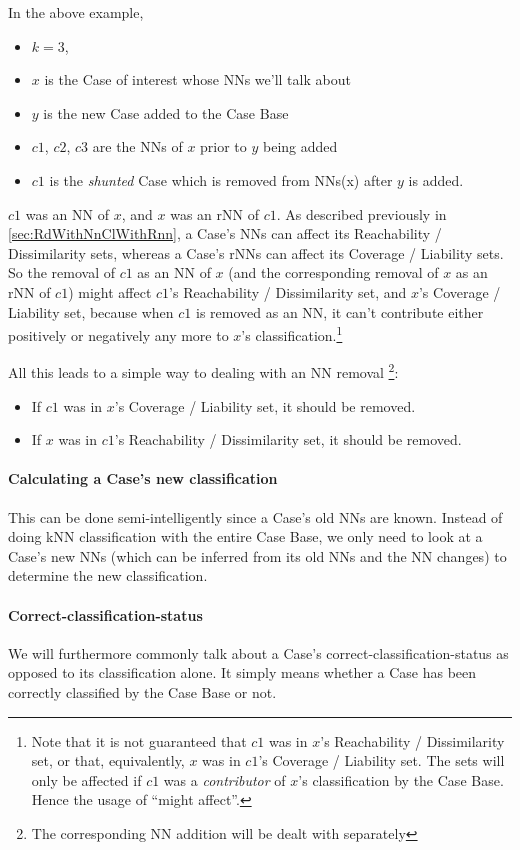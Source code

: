\documentclass[a4paper,11pt]{report}
\begin{document}
In the above example,
\begin{itemize}
	\item $k=3$, 
	\item $x$ is the Case of interest whose NNs  we'll talk about
	\item $y$ is the new Case added to the Case Base
	\item $c1$, $c2$, $c3$ are the NNs of $x$ prior to $y$ being added
	\item $c1$ is the \emph{shunted} Case which is removed from NNs(x) after $y$ is added.
\end{itemize}

$c1$ was an NN of $x$, and $x$ was an rNN of $c1$. As described previously in \ref{sec:RdWithNnClWithRnn}, a Case's NNs can affect its Reachability / Dissimilarity sets, whereas a Case's rNNs can affect its Coverage / Liability sets. So the removal of $c1$ as an NN of $x$ (and the corresponding removal of $x$ as an rNN of $c1$) might affect $c1$'s Reachability / Dissimilarity set, and $x$'s Coverage / Liability set, because when $c1$ is removed as an NN, it can't contribute either positively or negatively any more to $x$'s classification.\footnote{Note that it is not guaranteed that $c1$ was in $x$'s Reachability / Dissimilarity set, or that, equivalently, $x$ was in $c1$'s Coverage / Liability set. The sets will only be affected if $c1$ was a \emph{contributor} of $x$'s classification by the Case Base. Hence the usage of ``might affect''.}

All this leads to a simple way to dealing with an NN removal \footnote{The corresponding NN addition will be dealt with separately}:
\begin{itemize}
	\item If $c1$ was in $x$'s Coverage / Liability set, it should be removed.
	\item If $x$ was in $c1$'s Reachability / Dissimilarity set, it should be removed.
\end{itemize}

\paragraph{Calculating a Case's new classification}
This can be done semi-intelligently since a Case's old NNs are known. Instead of doing kNN classification with the entire Case Base, we only need to look at a Case's new NNs (which can be inferred from its old NNs and the NN changes) to determine the new classification.

\paragraph{Correct-classification-status}
We will furthermore commonly talk about a Case's correct-classification-status as opposed to its classification alone. It simply means whether a Case has been correctly classified by the Case Base or not. 
\end{document}
